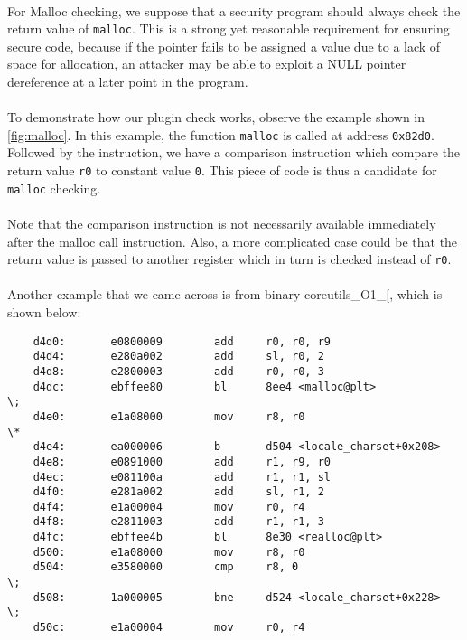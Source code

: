 \paragraph{}
For Malloc checking, we suppose that a security program should always check the
return value of \texttt{malloc}. This is a strong yet reasonable requirement
for ensuring secure code, because if the pointer fails to be assigned a value
due to a lack of space for allocation, an attacker may be able to
exploit a NULL pointer dereference at a later point in the program.

\paragraph{}
To demonstrate how our plugin check works, observe the example shown in
\ref{fig:malloc}. In this example, the function \texttt{malloc} is called at
address \texttt{0x82d0}. Followed by the instruction, we have a comparison
instruction which compare the return value \texttt{r0} to constant value
\texttt{0}. This piece of code is thus a candidate for \texttt{malloc}
checking.

\paragraph{}
Note that the comparison instruction is not necessarily available immediately after
the malloc call instruction. Also, a more complicated case could be that the
return value is passed to another register which in turn is checked
instead of \texttt{r0}.

\paragraph{}
Another example that we came across is from binary coreutils\_O1\_[, which is
shown below:

\begin{center}
\lstset{language=C,
caption=Malloc disassembly, breaklines=true, basicstyle=\tiny, numbers=none}
\begin{lstlisting}
    d4d0:       e0800009        add     r0, r0, r9
    d4d4:       e280a002        add     sl, r0, 2
    d4d8:       e2800003        add     r0, r0, 3
    d4dc:       ebffee80        bl      8ee4 <malloc@plt>             \;
    d4e0:       e1a08000        mov     r8, r0                        \*
    d4e4:       ea000006        b       d504 <locale_charset+0x208>
    d4e8:       e0891000        add     r1, r9, r0
    d4ec:       e081100a        add     r1, r1, sl
    d4f0:       e281a002        add     sl, r1, 2
    d4f4:       e1a00004        mov     r0, r4
    d4f8:       e2811003        add     r1, r1, 3
    d4fc:       ebffee4b        bl      8e30 <realloc@plt>
    d500:       e1a08000        mov     r8, r0
    d504:       e3580000        cmp     r8, 0                         \;
    d508:       1a000005        bne     d524 <locale_charset+0x228>   \;
    d50c:       e1a00004        mov     r0, r4
\end{lstlisting}
\end{center}

